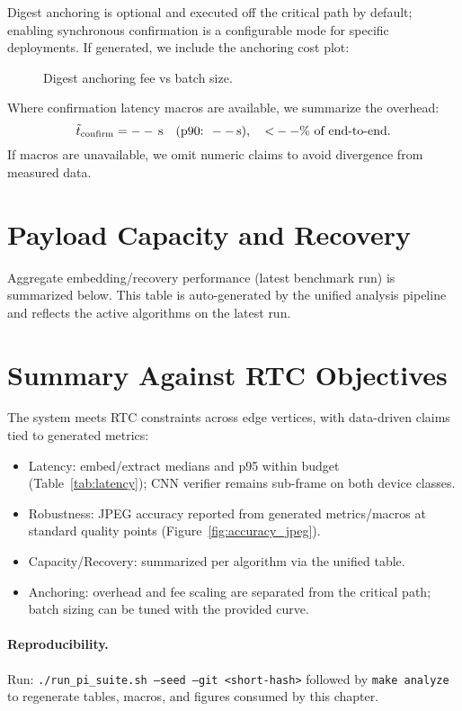 Digest anchoring is optional and executed off the critical path by default; enabling synchronous confirmation is a configurable mode for specific deployments. If generated, we include the anchoring cost plot:

\begin{figure}[ht]
  \centering
  \caption{Digest anchoring fee vs batch size.}
  \label{fig:anchoring_cost}
\end{figure}

Where confirmation latency macros are available, we summarize the overhead:
\[
\tilde t_{\text{confirm}}=--\,\text{s} \quad (\text{p90: } --\,\text{s}), \quad
\text{<}--\% \text{ of end-to-end.}
\]
If macros are unavailable, we omit numeric claims to avoid divergence from measured data.

\section{Payload Capacity and Recovery}
\label{sec:validation:payload}

Aggregate embedding/recovery performance (latest benchmark run) is summarized below. This table is auto-generated by the unified analysis pipeline and reflects the active algorithms on the latest run.

\section{Summary Against RTC Objectives}
\label{sec:exp:summary}

The system meets RTC constraints across edge vertices, with data-driven claims tied to generated metrics:
\begin{itemize}
    \item Latency: embed/extract medians and p95 within budget (Table~\ref{tab:latency}); CNN verifier remains sub-frame on both device classes.
    \item Robustness: JPEG accuracy reported from generated metrics/macros at standard quality points (Figure~\ref{fig:accuracy_jpeg}).
    \item Capacity/Recovery: summarized per algorithm via the unified table.
    \item Anchoring: overhead and fee scaling are separated from the critical path; batch sizing can be tuned with the provided curve.
\end{itemize}

\paragraph{Reproducibility.} Run: \texttt{./run\_pi\_suite.sh --seed  --git <short-hash>} followed by \texttt{make analyze} to regenerate tables, macros, and figures consumed by this chapter.
